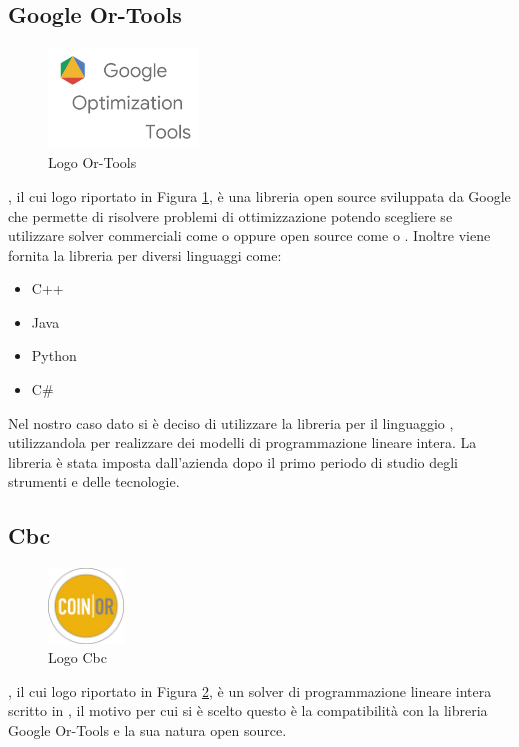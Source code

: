 \subsection{Google Or-Tools}
\begin{figure}[H]
	\begin{center} \includegraphics[width=4cm]{figures/google_or_tools}
		\caption[Logo Or-Tools]{Logo Or-Tools}  
		\label{logo_ortools} 

	\end{center}
\end{figure}
, il cui logo riportato in Figura \ref{logo_ortools}, è una libreria open source sviluppata da Google che permette di risolvere problemi di ottimizzazione potendo scegliere se utilizzare solver commerciali come  o  oppure open source come  o . Inoltre viene fornita la libreria per diversi linguaggi come:
\begin{itemize}
	\item C++
	\item Java
	\item Python
	\item C\#
\end{itemize}
Nel nostro caso dato si è deciso di utilizzare la libreria per il linguaggio , utilizzandola per realizzare dei modelli di programmazione lineare intera. La libreria è stata imposta dall'azienda dopo il primo periodo di studio degli strumenti e delle tecnologie.

\subsection{Cbc}

\begin{figure}[H]
	\begin{center} \includegraphics[width=2cm]{figures/coin_banner}
		\caption[Logo Cbc]{Logo Cbc}  
		\label{logo_cbc} 
	\end{center}
\end{figure}
, il cui logo riportato in Figura \ref{logo_cbc}, è un solver di programmazione lineare intera scritto in , il motivo per cui si è scelto questo è la compatibilità con la libreria Google Or-Tools e la sua natura open source.

